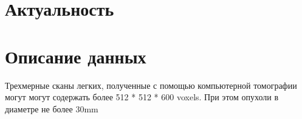 
\section{Актуальность}



\section{Описание данных}

Трехмерные сканы легких, полученные с помощью компьютерной томографии могут могут содержать более 512 * 512 * 600 voxels. При этом опухоли в диаметре не более 30mm 
